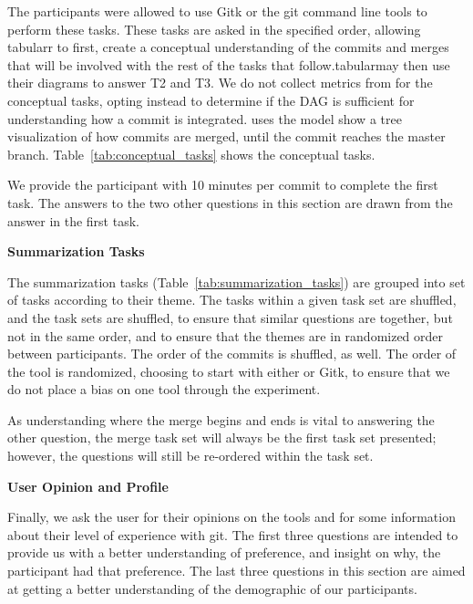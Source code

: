 The participants were allowed to use Gitk or the git command line tools
to perform these tasks. These tasks are asked in the specified order,
allowing tabularr to first, create a conceptual understanding of the
commits and merges that will be involved with the rest of the tasks that
follow.tabularmay then use their diagrams to answer T2 and T3. We do not
collect metrics from \tool for the conceptual tasks, opting instead to
determine if the DAG is sufficient for understanding how a commit is
integrated. \tool uses the \mt model show a tree visualization of how
commits are merged, until the commit reaches the master branch.
Table~\ref{tab:conceptual_tasks} shows the conceptual tasks.


We provide the participant with 10 minutes per commit to complete the
first task. The answers to the two other questions in this section are
drawn from the answer in the first task.

\textbf{Summarization Tasks}



The summarization tasks (Table~\ref{tab:summarization_tasks}) are
grouped into  set of tasks according to their theme. The
tasks within a given task set are shuffled, and the task sets are
shuffled, to ensure that similar questions are together, but not in the
same order, and to ensure that the themes are in randomized order
between participants. The order of the commits is shuffled, as well. The
order of the tool is randomized, choosing to start with either \tool or
Gitk, to ensure that we do not place a bias on one tool through the
experiment.

As understanding where the merge begins and ends is vital to answering
the other question, the merge task set will always be the first task set
presented; however, the questions will still be re-ordered within the
task set.

\textbf{User Opinion and Profile}

Finally, we ask the user for their opinions on the tools and for some
information about their level of experience with git.   The first three questions are intended
to provide us with a better understanding of preference, and insight on
why, the participant had that preference.  The last three questions in
this section are aimed at getting a better understanding of the
demographic of our participants.

